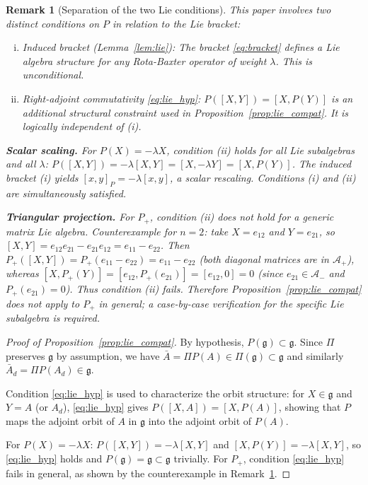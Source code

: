\documentclass[10pt]{amsart}
\newcommand{\Ac}{\mathcal{A}}
\numberwithin{equation}{section}
\newtheorem{remark}[theorem]{Remark}
\begin{document}
\begin{remark}[Separation of the two Lie conditions]\label{rem:lie_separation}
This paper involves two distinct conditions on $P$ in relation to the Lie bracket:
\begin{enumerate}[(i)]
  \item \emph{Induced bracket} (Lemma~\ref{lem:lie}): The bracket \eqref{eq:bracket}
        defines a Lie algebra structure for \emph{any} Rota-Baxter operator of weight
        $\lambda$. This is unconditional.
  \item \emph{Right-adjoint commutativity} \eqref{eq:lie_hyp}: $P([X,Y])=[X,P(Y)]$ is
        an additional structural constraint used in Proposition~\ref{prop:lie_compat}.
        It is logically independent of (i).
\end{enumerate}

\noindent\textbf{Scalar scaling.} For $P(X)=-\lambda X$, condition (ii) holds for all
Lie subalgebras and all $\lambda$:
$P([X,Y]) = -\lambda[X,Y] = [X,-\lambda Y] = [X,P(Y)]$. The induced bracket (i)
yields $[x,y]_P = -\lambda[x,y]$, a scalar rescaling. Conditions (i) and (ii) are
simultaneously satisfied.

\noindent\textbf{Triangular projection.} For $P_+$, condition (ii) does \emph{not}
hold for a generic matrix Lie algebra. Counterexample for $n=2$: take $X = e_{12}$ and
$Y = e_{21}$, so
$[X,Y] = e_{12}e_{21} - e_{21}e_{12} = e_{11} - e_{22}$.
Then $P_+([X,Y]) = P_+(e_{11}-e_{22}) = e_{11}-e_{22}$ (both diagonal matrices are in
$\Ac_+$), whereas $[X,P_+(Y)] = [e_{12}, P_+(e_{21})] = [e_{12}, 0] = 0$ (since
$e_{21} \in \Ac_-$ and $P_+(e_{21}) = 0$). Thus condition (ii) fails. Therefore
Proposition~\ref{prop:lie_compat} does not apply to $P_+$ in general; a case-by-case
verification for the specific Lie subalgebra is required.
\end{remark}

\begin{proof}[Proof of Proposition~\ref{prop:lie_compat}]
By hypothesis, $P(\mathfrak{g}) \subset \mathfrak{g}$. Since $\Pi$ preserves
$\mathfrak{g}$ by assumption, we have $\bar{A} = \Pi P(A) \in \Pi(\mathfrak{g})
\subset \mathfrak{g}$ and similarly $\bar{A}_d = \Pi P(A_d) \in \mathfrak{g}$.

Condition \eqref{eq:lie_hyp} is used to characterize the orbit structure: for
$X \in \mathfrak{g}$ and $Y = A$ (or $A_d$), \eqref{eq:lie_hyp} gives
$P([X,A]) = [X,P(A)]$, showing that $P$ maps the adjoint orbit of $A$ in $\mathfrak{g}$
into the adjoint orbit of $P(A)$.

For $P(X) = -\lambda X$: $P([X,Y]) = -\lambda[X,Y]$ and
$[X, P(Y)] = -\lambda[X,Y]$, so \eqref{eq:lie_hyp} holds and
$P(\mathfrak{g}) = \mathfrak{g} \subset \mathfrak{g}$ trivially. For $P_+$, condition
\eqref{eq:lie_hyp} fails in general, as shown by the counterexample in
Remark~\ref{rem:lie_separation}.
\end{proof}
\end{document}
